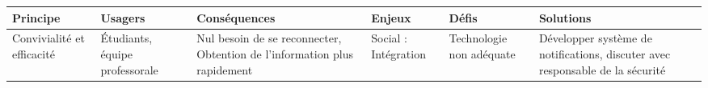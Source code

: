 \begin{tabular}{P{0.15\textwidth}P{0.15\textwidth}P{0.15\textwidth}P{0.15\textwidth}P{0.15\textwidth}P{0.15\textwidth}}
	\hline
	\bf Principe & \bf Usagers & \bf Conséquences & \bf Enjeux & \bf Défis & \bf Solutions \\
	\hline
	\hline
	Convivialité et efficacité
	& Étudiants, équipe professorale
	& Nul besoin de se reconnecter, Obtention de l'information plus rapidement
	& Social : Intégration
	& Technologie non adéquate
	& Développer système de notifications, discuter avec responsable de la sécurité
	\\
	\hline
\end{tabular}